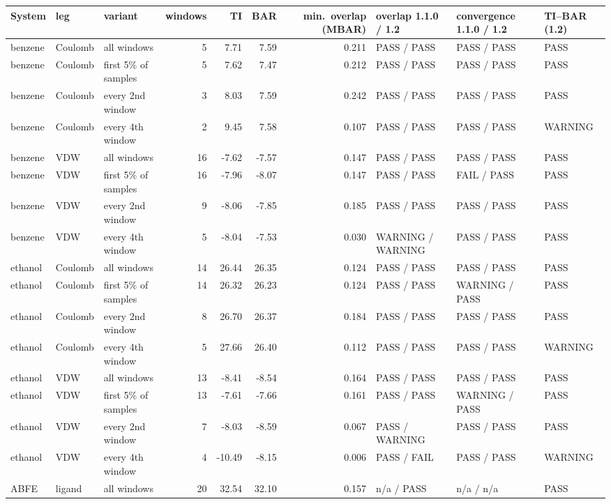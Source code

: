 \begin{tabular}{lllrrrrlll}
\toprule
System & leg & variant & windows & TI & BAR & min.\ overlap (MBAR) & overlap 1.1.0 / 1.2 & convergence 1.1.0 / 1.2 & TI--BAR (1.2) \\
\midrule
benzene & Coulomb & all windows & 5 & 7.71 & 7.59 & 0.211 & PASS / PASS & PASS / PASS & PASS \\
benzene & Coulomb & first 5\% of samples & 5 & 7.62 & 7.47 & 0.212 & PASS / PASS & PASS / PASS & PASS \\
benzene & Coulomb & every 2nd window & 3 & 8.03 & 7.59 & 0.242 & PASS / PASS & PASS / PASS & PASS \\
benzene & Coulomb & every 4th window & 2 & 9.45 & 7.58 & 0.107 & PASS / PASS & PASS / PASS & WARNING \\
benzene & VDW & all windows & 16 & -7.62 & -7.57 & 0.147 & PASS / PASS & PASS / PASS & PASS \\
benzene & VDW & first 5\% of samples & 16 & -7.96 & -8.07 & 0.147 & PASS / PASS & FAIL / PASS & PASS \\
benzene & VDW & every 2nd window & 9 & -8.06 & -7.85 & 0.185 & PASS / PASS & PASS / PASS & PASS \\
benzene & VDW & every 4th window & 5 & -8.04 & -7.53 & 0.030 & WARNING / WARNING & PASS / PASS & PASS \\
ethanol & Coulomb & all windows & 14 & 26.44 & 26.35 & 0.124 & PASS / PASS & PASS / PASS & PASS \\
ethanol & Coulomb & first 5\% of samples & 14 & 26.32 & 26.23 & 0.124 & PASS / PASS & WARNING / PASS & PASS \\
ethanol & Coulomb & every 2nd window & 8 & 26.70 & 26.37 & 0.184 & PASS / PASS & PASS / PASS & PASS \\
ethanol & Coulomb & every 4th window & 5 & 27.66 & 26.40 & 0.112 & PASS / PASS & PASS / PASS & WARNING \\
ethanol & VDW & all windows & 13 & -8.41 & -8.54 & 0.164 & PASS / PASS & PASS / PASS & PASS \\
ethanol & VDW & first 5\% of samples & 13 & -7.61 & -7.66 & 0.161 & PASS / PASS & WARNING / PASS & PASS \\
ethanol & VDW & every 2nd window & 7 & -8.03 & -8.59 & 0.067 & PASS / WARNING & PASS / PASS & PASS \\
ethanol & VDW & every 4th window & 4 & -10.49 & -8.15 & 0.006 & PASS / FAIL & PASS / PASS & WARNING \\
ABFE & ligand & all windows & 20 & 32.54 & 32.10 & 0.157 & n/a / PASS & n/a / n/a & PASS \\

\end{tabular}
